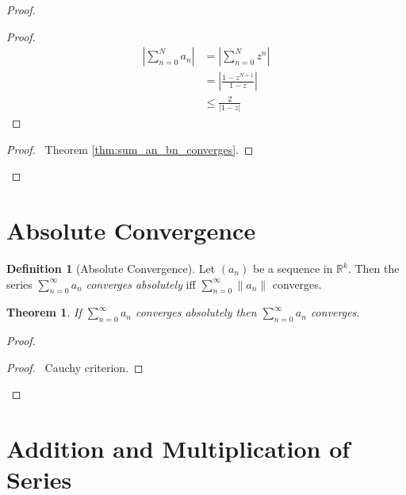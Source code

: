 \documentclass{book}
\let\qed\relax
\newtheorem{thm}[prop]{Theorem}
\theoremstyle{definition}
\newtheorem{df}[prop]{Definition}
\begin{document}
\begin{proof}
\pf
{}
\begin{proof}
\pf
\begin{align*}
\left| \sum_{n=0}^N a_n \right|
& = \left| \sum_{n=0}^N z^n \right| \\
& = \left| \frac{1 - z^{N+1}}{1-z} \right| \\
& \leq \frac{2}{|1-z|}
\end{align*}
\end{proof}
\qedstep
\begin{proof}
\pf\ Theorem \ref{thm:sum_an_bn_converges}.
\end{proof}
\qed
\end{proof}

\section{Absolute Convergence}

\begin{df}[Absolute Convergence]
Let $(a_n)$ be a sequence in $\mathbb{R}^k$. Then the series $\sum_{n=0}^\infty a_n$ \emph{converges absolutely} iff $\sum_{n=0}^\infty \|a_n\|$ converges.
\end{df}

\begin{thm}
If $\sum_{n=0}^\infty a_n$ converges absolutely then $\sum_{n=0}^\infty a_n$ converges.
\end{thm}

\begin{proof}
\pf
{}
\qedstep
\begin{proof}
	\pf\ Cauchy criterion.
\end{proof}
\qed
\end{proof}

\section{Addition and Multiplication of Series}
\end{document}

